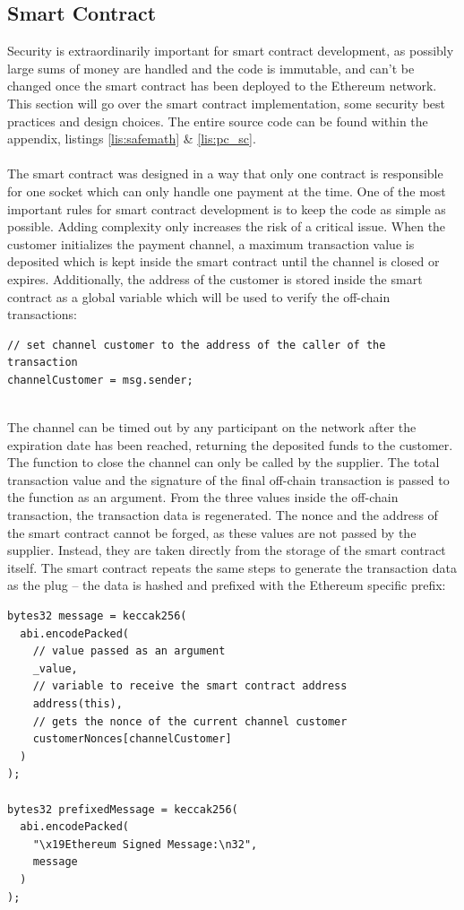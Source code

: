 \subsection{Smart Contract}
Security is extraordinarily important for smart contract development, as possibly large sums of money are handled and the code is immutable, and can’t be changed once the smart contract has been deployed to the Ethereum network.
This section will go over the smart contract implementation, some security best practices and design choices.
The entire source code can be found within the appendix, listings \ref{lis:safemath} \& \ref{lis:pc_sc}.
\\\\
The smart contract was designed in a way that only one contract is responsible for one socket which can only handle one payment at the time.
One of the most important rules for smart contract development is to keep the code as simple as possible.
Adding complexity only increases the risk of a critical issue.
When the customer initializes the payment channel, a maximum transaction value is deposited which is kept inside the smart contract until the channel is closed or expires.
Additionally, the address of the customer is stored inside the smart contract as a global variable which will be used to verify the off-chain transactions:
\begin{lstlisting}[language=Solidity, numbers=none]
// set channel customer to the address of the caller of the transaction
channelCustomer = msg.sender;
\end{lstlisting}
\leavevmode
\\
The channel can be timed out by any participant on the network after the expiration date has been reached, returning the deposited funds to the customer.
The function to close the channel can only be called by the supplier.
The total transaction value and the signature of the final off-chain transaction is passed to the function as an argument.
From the three values inside the off-chain transaction, the transaction data is regenerated.
The nonce and the address of the smart contract cannot be forged, as these values are not passed by the supplier.
Instead, they are taken directly from the storage of the smart contract itself.
The smart contract repeats the same steps to generate the transaction data as the plug – the data is hashed and prefixed with the Ethereum specific prefix:
\\
\begin{lstlisting}[language=Solidity, numbers=none]
bytes32 message = keccak256(
  abi.encodePacked(
    // value passed as an argument
    _value,
    // variable to receive the smart contract address
    address(this),
    // gets the nonce of the current channel customer
    customerNonces[channelCustomer]
  )
);

bytes32 prefixedMessage = keccak256(
  abi.encodePacked(
    "\x19Ethereum Signed Message:\n32",
    message
  )
);
\end{lstlisting}
